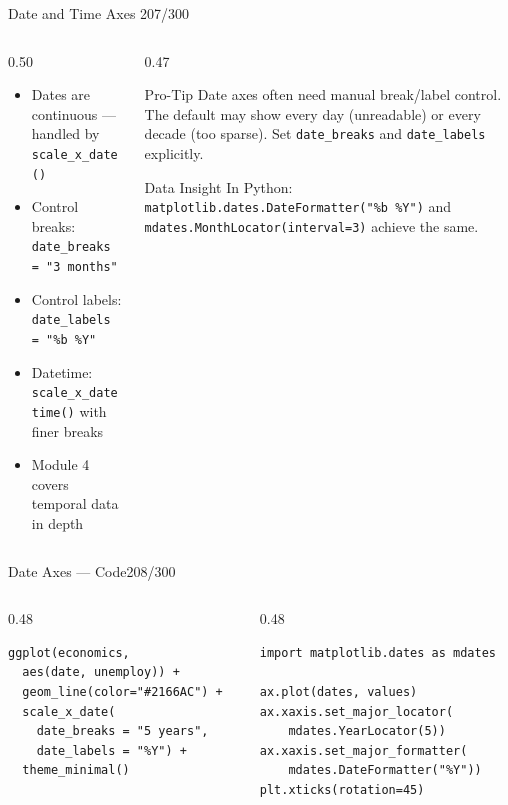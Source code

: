\documentclass[10pt]{beamer}
\newcommand{\smark}[1]{\hfill{\scriptsize\color{codegray}#1}}
\begin{document}
\begin{frame}{Date and Time Axes}
\smark{207/300}
\begin{columns}[T]
\begin{column}{0.50\textwidth}
\begin{itemize}
    \item Dates are continuous --- handled by \texttt{scale\_x\_date()}
    \item Control breaks: \texttt{date\_breaks = "3 months"}
    \item Control labels: \texttt{date\_labels = "\%b \%Y"}
    \item Datetime: \texttt{scale\_x\_datetime()} with finer breaks
    \item Module 4 covers temporal data in depth
\end{itemize}
\end{column}
\begin{column}{0.47\textwidth}
\begin{alertblock}{Pro-Tip}
    \scriptsize Date axes often need manual break/label control. The default may show every day (unreadable) or every decade (too sparse). Set \texttt{date\_breaks} and \texttt{date\_labels} explicitly.
\end{alertblock}
\vspace{0.2cm}
\begin{exampleblock}{Data Insight}
    \scriptsize In Python: \texttt{matplotlib.dates.DateFormatter("\%b \%Y")} and \texttt{mdates.MonthLocator(interval=3)} achieve the same.
\end{exampleblock}
\end{column}
\end{columns}
\end{frame}

\begin{frame}[fragile]{Date Axes --- Code}\smark{208/300}
\begin{columns}[T]
\begin{column}{0.48\textwidth}
\begin{lstlisting}[style=Rstyle]
ggplot(economics,
  aes(date, unemploy)) +
  geom_line(color="#2166AC") +
  scale_x_date(
    date_breaks = "5 years",
    date_labels = "%Y") +
  theme_minimal()
\end{lstlisting}
\end{column}
\begin{column}{0.48\textwidth}
\begin{lstlisting}[style=Pystyle]
import matplotlib.dates as mdates

ax.plot(dates, values)
ax.xaxis.set_major_locator(
    mdates.YearLocator(5))
ax.xaxis.set_major_formatter(
    mdates.DateFormatter("%Y"))
plt.xticks(rotation=45)
\end{lstlisting}
\end{column}
\end{columns}
\end{frame}
\end{document}
